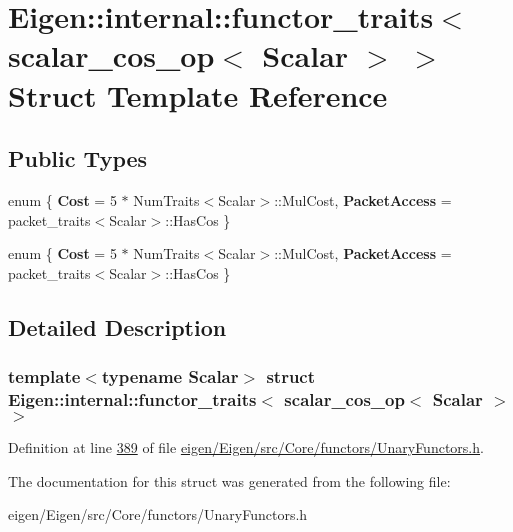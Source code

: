 \hypertarget{struct_eigen_1_1internal_1_1functor__traits_3_01scalar__cos__op_3_01_scalar_01_4_01_4}{}\section{Eigen\+:\+:internal\+:\+:functor\+\_\+traits$<$ scalar\+\_\+cos\+\_\+op$<$ Scalar $>$ $>$ Struct Template Reference}
\label{struct_eigen_1_1internal_1_1functor__traits_3_01scalar__cos__op_3_01_scalar_01_4_01_4}
\subsection*{Public Types}
\begin{DoxyCompactItemize}
\item 
\mbox{\label{struct_eigen_1_1internal_1_1functor__traits_3_01scalar__cos__op_3_01_scalar_01_4_01_4_ab0e86505b285a354e72ef09c89c23540}} 
enum \{ {\bfseries Cost} = 5 $\ast$ Num\+Traits$<$Scalar$>$\+:\+:Mul\+Cost, 
{\bfseries Packet\+Access} = packet\+\_\+traits$<$Scalar$>$\+:\+:Has\+Cos
 \}
\item 
\mbox{\label{struct_eigen_1_1internal_1_1functor__traits_3_01scalar__cos__op_3_01_scalar_01_4_01_4_a7e74fa6724d197a13adea410f33d0413}} 
enum \{ {\bfseries Cost} = 5 $\ast$ Num\+Traits$<$Scalar$>$\+:\+:Mul\+Cost, 
{\bfseries Packet\+Access} = packet\+\_\+traits$<$Scalar$>$\+:\+:Has\+Cos
 \}
\end{DoxyCompactItemize}


\subsection{Detailed Description}
\subsubsection*{template$<$typename Scalar$>$\newline
struct Eigen\+::internal\+::functor\+\_\+traits$<$ scalar\+\_\+cos\+\_\+op$<$ Scalar $>$ $>$}



Definition at line \hyperlink{eigen_2_eigen_2src_2_core_2functors_2_unary_functors_8h_source_l00389}{389} of file \hyperlink{eigen_2_eigen_2src_2_core_2functors_2_unary_functors_8h_source}{eigen/\+Eigen/src/\+Core/functors/\+Unary\+Functors.\+h}.



The documentation for this struct was generated from the following file\+:\begin{DoxyCompactItemize}
\item 
eigen/\+Eigen/src/\+Core/functors/\+Unary\+Functors.\+h\end{DoxyCompactItemize}
